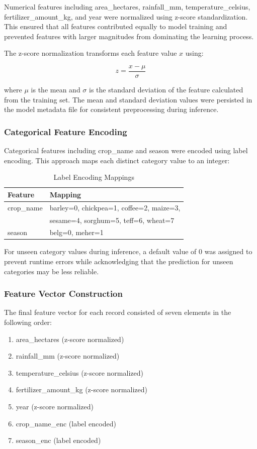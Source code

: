 Numerical features including area\_hectares, rainfall\_mm, temperature\_celsius, fertilizer\_amount\_kg, and year were normalized using z-score standardization. This ensured that all features contributed equally to model training and prevented features with larger magnitudes from dominating the learning process.

The z-score normalization transforms each feature value \(x\) using:

\[
z = \frac{x - \mu}{\sigma}
\]

where \(\mu\) is the mean and \(\sigma\) is the standard deviation of the feature calculated from the training set. The mean and standard deviation values were persisted in the model metadata file for consistent preprocessing during inference.

\subsubsection{Categorical Feature Encoding}

Categorical features including crop\_name and season were encoded using label encoding. This approach maps each distinct category value to an integer:

\begin{table}[H]
\centering
\caption{Label Encoding Mappings}
\label{tab:label-encoding}
\begin{tabular}{ll}
\toprule
\textbf{Feature} & \textbf{Mapping} \\
\midrule
crop\_name & barley=0, chickpea=1, coffee=2, maize=3, \\
           & sesame=4, sorghum=5, teff=6, wheat=7 \\
season & belg=0, meher=1 \\
\bottomrule
\end{tabular}
\end{table}

For unseen category values during inference, a default value of 0 was assigned to prevent runtime errors while acknowledging that the prediction for unseen categories may be less reliable.

\subsubsection{Feature Vector Construction}

The final feature vector for each record consisted of seven elements in the following order:
\begin{enumerate}
  \item area\_hectares (z-score normalized)
  \item rainfall\_mm (z-score normalized)
  \item temperature\_celsius (z-score normalized)
  \item fertilizer\_amount\_kg (z-score normalized)
  \item year (z-score normalized)
  \item crop\_name\_enc (label encoded)
  \item season\_enc (label encoded)
\end{enumerate}

